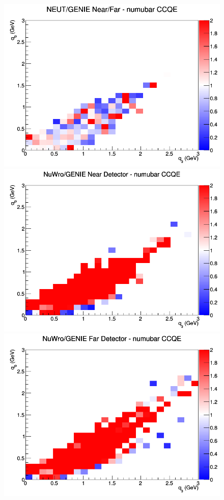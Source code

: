 \begin{figure}[h]
\endminipage
{}
\includegraphics[width=\linewidth]{eff_q0_q3/LAr/ratios/CCQE_NEUT_GENIE_numubar_NF_q3_q0.png}
\endminipage
\newline
{}
\includegraphics[width=\linewidth]{eff_q0_q3/LAr/ratios/CCQE_NuWro_GENIE_numubar_near_q3_q0.png}
\endminipage
{}
\includegraphics[width=\linewidth]{eff_q0_q3/LAr/ratios/CCQE_NuWro_GENIE_numubar_far_q3_q0.png}

\end{figure}
